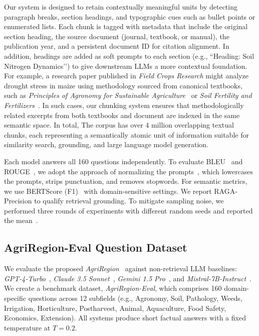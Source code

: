 \documentclass{ieeeaccess}
\newcommand{\AgriRegion}{\textit{AgriRegion}}
\begin{document}
Our system is designed to retain contextually meaningful units by detecting paragraph breaks, section headings, and typographic cues such as bullet points or enumerated lists. Each chunk is tagged with metadata that include the original section heading, the source document (journal, textbook, or manual), the publication year, and a persistent document ID for citation alignment. In addition, headings are added as soft prompts to each section (e.g., ``Heading: Soil Nitrogen Dynamics’’) to give downstream LLMs a more contextual foundation. For example, a research paper published in \textit{Field Crops Research} might analyze drought stress in maize using methodology sourced from canonical textbooks, such as \textit{Principles of Agronomy for Sustainable Agriculture}~\cite{reddyagronomy} or \textit{Soil Fertility and Fertilizers}~\cite{havlinfertilizer}. In such cases, our chunking system ensures that methodologically related excerpts from both textbooks and document are indexed in the same semantic space. In total, The corpus has over 4 million overlapping textual chunks, each representing a semantically atomic unit of information suitable for similarity search, grounding, and large language model generation.


Each model answers all 160 questions independently. To evaluate BLEU~\cite{papineni2002bleu} and ROUGE~\cite{lin2004rouge}, we adopt the approach of normalizing the prompts~\cite{liu2023promptnorm}, which lowercases the prompts, strips punctuation, and removes stopwords. 
For semantic metrics, we use BERTScore (F1)~\cite{zhang2020bertscore} with domain-sensitive settings. 
We report RAGA-Precision to qualify retrieval grounding.
To mitigate sampling noise, we performed three rounds of experiments with different random seeds and reported the mean~\cite{reimers2020evaluation}.


\subsection{AgriRegion-Eval Question Dataset}

We evaluate the proposed \AgriRegion~ against non-retrieval LLM baselines: \textit{GPT-4-Turbo}~\cite{openai2024gpt4t}, \textit{Claude 3.5 Sonnet}~\cite{anthropic2024claude35}, \textit{Gemini 1.5 Pro}~\cite{gemini}, and \textit{Mistral-7B-Instruct}~\cite{jiang2023mistral7b}. 
We create a benchmark dataset, \textit{AgriRegion-Eval}, which comprises 160 domain-specific questions across 12 subfields (e.g., Agronomy, Soil, Pathology, Weeds, Irrigation, Horticulture, Postharvest, Animal, Aquaculture, Food Safety, Economics, Extension). 
All systems produce short factual answers with a fixed temperature at $T=0.2$. 
\end{document}
